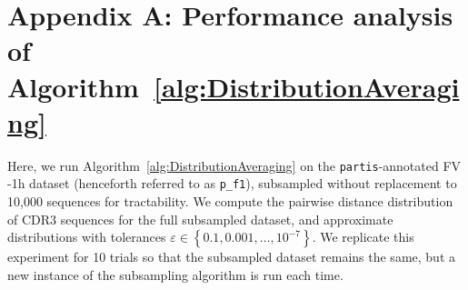 \documentclass{article}
\newcommand{\partis}{\texttt{partis}}
\newcommand{\beginsupplement}{%
        \setcounter{table}{0}
        \renewcommand{\thetable}{S\arabic{table}}%
        \setcounter{figure}{0}
        \renewcommand{\thefigure}{S\arabic{figure}}%
     }
\begin{document}



\beginsupplement

\section*{Appendix A: Performance analysis of Algorithm~\ref{alg:DistributionAveraging}}
Here, we run Algorithm~\ref{alg:DistributionAveraging} on the \partis-annotated FV -1h dataset (henceforth referred to as \texttt{p\_f1}), subsampled without replacement to 10,000 sequences for tractability.
We compute the pairwise distance distribution of CDR3 sequences for the full subsampled dataset, and approximate distributions with tolerances $\varepsilon \in \left\{0.1, 0.001, \dotsc, 10^{-7} \right\}$.
We replicate this experiment for 10 trials so that the subsampled dataset remains the same, but a new instance of the subsampling algorithm is run each time.
\end{document}

